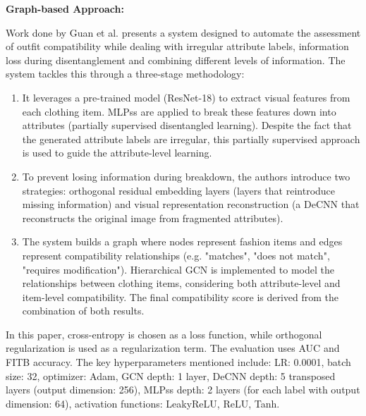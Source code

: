 \vspace{0.5cm}

\textbf{Graph-based Approach:}

\vspace{0.5cm}

Work done by Guan et al. presents a system designed to automate the assessment of outfit compatibility while dealing with irregular attribute labels, information loss during disentanglement and combining different levels of information. The system tackles this through a three-stage methodology: \cite[cf.]{guan_partially_2022}

\begin{enumerate}
  \item It leverages a pre-trained model (\acs{ResNet}-18) to extract visual features from each clothing item. \acsp{MLPs} are applied to break these features down into attributes (partially supervised disentangled learning). Despite the fact that the generated attribute labels are irregular, this partially supervised approach is used to guide the attribute-level learning.
  \item To prevent losing information during breakdown, the authors introduce two strategies: orthogonal residual embedding layers (layers that reintroduce missing information) and visual representation reconstruction (a \acs{DeCNN} that reconstructs the original image from fragmented attributes).
  \item The system builds a graph where nodes represent fashion items and edges represent compatibility relationships (e.g. "matches", "does not match", "requires modification"). Hierarchical \acs{GCN} is implemented to model the relationships between clothing items, considering both attribute-level and item-level compatibility. The final compatibility score is derived from the combination of both results.
\end{enumerate}

In this paper, cross-entropy is chosen as a loss function, while orthogonal regularization is used as a regularization term. The evaluation uses \acs{AUC} and \acs{FITB} accuracy. The key hyperparameters mentioned include: \acs{LR}: 0.0001, batch size: 32, optimizer: Adam, \acs{GCN} depth: 1 layer, \acs{DeCNN} depth: 5 transposed layers (output dimension: 256), \acsp{MLPs} depth: 2 layers (for each label with output dimension: 64), activation functions: LeakyReLU, \acs{ReLU}, Tanh. \cite[cf.]{guan_partially_2022}

\vspace{0.5cm}


